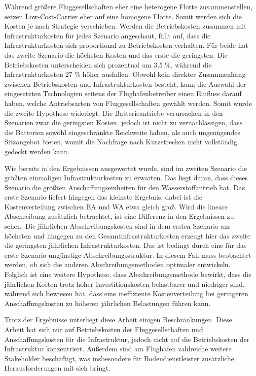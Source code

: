 Während größere Fluggesellschaften eher eine heterogene Flotte zusammenstellen, 
setzen Low-Cost-Carrier eher auf eine homogene Flotte.
Somit werden sich die Kosten je nach Strategie verschieben.
Werden die Betriebskosten zusammen mit Infrastrukturkosten für jedes Szenario angeschaut, fällt auf, 
dass die Infrastrukturkosten sich proportional zu Betriebskosten verhalten. 
Für beide hat das zweite Szenario die höchsten Kosten und das erste die geringsten. 
Die Betriebskosten unterscheiden sich prozentual um 3,5 \%, 
während die Infrastrukturkosten 27 \% höher ausfallen.
Obwohl kein direkter Zusammenhang zwischen Betriebskosten und Infrastrukturkosten besteht, 
kann die Auswahl der eingesetzten Technologien seitens der Flughafenbetreiber einen Einfluss darauf haben, 
welche Antriebsarten von Fluggesellschaften gewählt werden. Somit wurde die zweite Hypothese widerlegt.
Die Batterieantriebe verursachen in den Szenarien zwar die geringsten Kosten,
jedoch ist nicht zu vernachlässigen, dass die Batterien sowohl eingeschränkte Reichweite haben, 
als auch ungenügendes Sitzangebot bieten, womit die Nachfrage nach Kurzstrecken nicht vollständig gedeckt werden kann.


Wie bereits in den Ergebnissen ausgewertet wurde, sind im zweiten Szenario die größten einmaligen Infrastrukturkosten zu erwarten.
Das liegt daran, dass dieses Szenario die größten Anschaffungseinheiten für den Wasserstoffantrieb hat. 
Das erste Szenario liefert hingegen das kleinste Ergebnis, dabei ist die Kostenverteilung zwischen BA und WA etwa gleich groß.
Wird die lineare Abschreibung zusätzlich betrachtet, ist eine Differenz in den Ergebnissen zu sehen. 
Die jährlichen Abschreibungskosten sind in dem ersten Szenario am höchsten 
und hingegen zu den Gesamtinfrastrukturkosten erzeugt hier das zweite die geringsten jährlichen Infrastrukturkosten.
Das ist bedingt durch eine für das erste Szenario ungünstige Abschreibungsstruktur. 
In diesem Fall muss beobachtet werden, ob sich die anderen Abschreibungsmethoden optimaler entwickeln.
Folglich ist eine weitere Hypothese, dass Abschreibungsmethode bewirkt, 
dass die jährlichen Kosten trotz hoher Investitionskosten belastbarer und niedriger sind, 
während sich bewiesen hat, dass eine ineffiziente Kostenverteilung bei geringeren Anschaffungskosten zu 
höheren jährlichen Belastungen führen kann.

%
Trotz der Ergebnisse unterliegt diese Arbeit einigen Beschränkungen. %
Diese Arbeit hat sich nur auf Betriebskosten der Fluggesellschaften und Anschaffungskosten für die Infrastruktur,
jedoch nicht auf die Betriebskosten der Infrastruktur konzentriert. 
Außerdem sind am Flughafen zahlreiche weitere Stakeholder beschäftigt, 
was insbesondere für Bodendienstleister zusätzliche Herausforderungen mit sich bringt.

